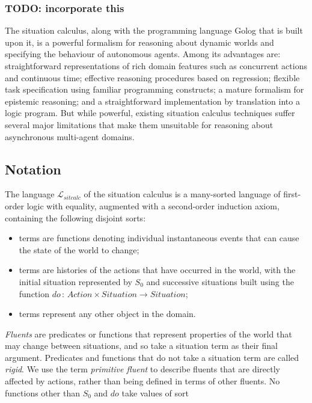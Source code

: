 \subsubsection{TODO: incorporate this}

The situation calculus, along with the programming language Golog
that is built upon it, is a powerful formalism for reasoning about
dynamic worlds and specifying the behaviour of autonomous agents.
Among its advantages are: straightforward representations of rich
domain features such as concurrent actions and continuous time; effective
reasoning procedures based on regression; flexible task specification
using familiar programming constructs; a mature formalism for epistemic
reasoning; and a straightforward implementation by translation into
a logic program. But while powerful, existing situation calculus techniques
suffer several major limitations that make them unsuitable for reasoning
about asynchronous multi-agent domains.


\subsection{Notation\label{sec:Background:SC:Notation}}

The language $\mathcal{L}_{sitcalc}$ of the situation calculus is
a many-sorted language of first-order logic with equality, augmented
with a second-order induction axiom, containing the following disjoint
sorts:

\begin{itemize}
\item \emph{} terms are functions denoting individual instantaneous
events that can cause the state of the world to change; 
\item {} terms are histories of the actions that have occurred
in the world, with the initial situation represented by $S_{0}$ and
successive situations built using the function $do\,:\, Action\times Situation\rightarrow Situation$; 
\item {} terms represent any other object in the domain. 
\end{itemize}
\emph{Fluents} are predicates or functions that represent properties
of the world that may change between situations, and so take a situation
term as their final argument. Predicates and functions that do not
take a situation term are called \emph{rigid}. We use the term \emph{primitive
fluent} to describe fluents that are directly affected by actions,
rather than being defined in terms of other fluents. No functions
other than $S_{0}$ and $do$ take values of sort 

